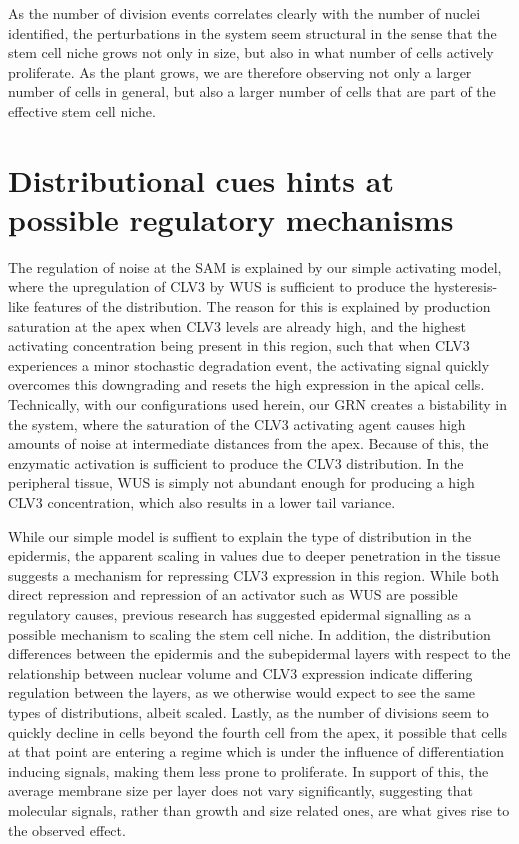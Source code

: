 As the number of division events correlates clearly with the number of nuclei
identified, the perturbations in the system seem structural in the sense that
the stem cell niche grows not only in size, but also in what number of cells
actively proliferate. As the plant grows, we are therefore observing not only a
larger number of cells in general, but also a larger number of cells that are
part of the effective stem cell niche.

\section{Distributional cues hints at possible regulatory mechanisms}
The regulation of noise at the SAM is explained by our simple activating model,
where the upregulation of CLV3 by WUS is sufficient to produce the
hysteresis-like features of the distribution. The reason for this is explained
by production saturation at the apex when CLV3 levels are already high, and the
highest activating concentration being present in this region, such that when
CLV3 experiences a minor stochastic degradation event, the activating signal
quickly overcomes this downgrading and resets the high expression in the apical
cells. Technically, with our configurations used herein, our GRN creates a
bistability in the system, where the saturation of the CLV3 activating agent
causes high amounts of noise at intermediate distances from the apex. Because of
this, the enzymatic activation is sufficient to produce the CLV3 distribution.
In the peripheral tissue, WUS is simply not abundant enough for producing a
high CLV3 concentration, which also results in a lower tail variance. 

While our simple model is suffient to explain the type of distribution in the
epidermis, the apparent scaling in values due to deeper penetration in the
tissue suggests a mechanism for repressing CLV3 expression in this region. While
both direct repression and repression of an activator such as WUS are
possible regulatory causes, previous research has suggested epidermal
signalling as a possible mechanism to scaling the stem cell niche. In addition, the
distribution differences between the epidermis and the subepidermal layers with
respect to the relationship between nuclear volume and CLV3 expression indicate
differing regulation between the layers, as we otherwise would expect to see the
same types of distributions, albeit scaled. Lastly, as the number of divisions seem to
quickly decline in cells beyond the fourth cell from the apex, it possible that cells at that
point are entering a regime which is under the influence of differentiation
inducing signals, making them less prone to proliferate. In support of this, the
average membrane size per layer does not vary significantly, suggesting that
molecular signals, rather than growth and size related ones, are what gives
rise to the observed effect.  

